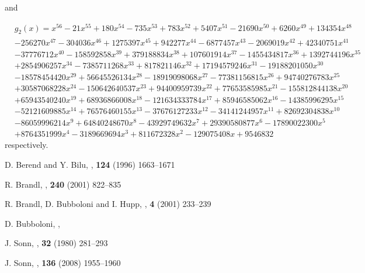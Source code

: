 \documentclass[reqno,12pt]{amsart}
\theoremstyle{remark}
\theoremstyle{definition}
\theoremstyle{citing}
\numberwithin{theorem}{section}
\numberwithin{equation}{section}
\begin{document}
and

\begin{eqnarray*}
 & g_{2}(x)=x^{56}-21x^{55}+180x^{54}-735x^{53}+783x^{52}+5407x^{51}-21690x^{50}+6260x^{49}+134354x^{48}\\
 & -256270x^{47}-304036x^{46}+1275397x^{45}+942277x^{44}-6877457x^{43}-2069019x^{42}+42340751x^{41}\\
 & -37776712x^{40}-158592858x^{39}+379188834x^{38}+107601914x^{37}-1455434817x^{36}+1392744196x^{35}\\
 & +2854906257x^{34}-7385711268x^{33}+817821146x^{32}+17194579246x^{31}-19188201050x^{30}\\
 & -18578454420x^{29}+56645526134x^{28}-18919098068x^{27}-77381156815x^{26}+94740276783x^{25}\\
 & +30587068228x^{24}-150642640537x^{23}+94400959739x^{22}+77653585985x^{21}-155812844138x^{20}\\
 & +65943540240x^{19}+68936866008x^{18}-121634333784x^{17}+85946585062x^{16}-14385996295x^{15}\\
 & -52121609885x^{14}+76576460155x^{13}-37676127233x^{12}-34141244957x^{11}+82692304838x^{10}\\
 & -86059996214x^{9}+64840248670x^{8}-43929749632x^{7}+29390580877x^{6}-17890022300x^{5}\\
 & +8764351999x^{4}-3189669694x^{3}+811672328x^{2}-129075408x+9546832\end{eqnarray*}
respectively.



\begin{thebibliography}{10}

D. Berend and Y. Bilu,
,
 {\bf 124} (1996) 1663--1671

R. Brandl,
,
 {\bf 240} (2001) 822--835

R. Brandl, D. Bubboloni and I. Hupp,
,
 {\bf 4} (2001) 233--239

D. Bubboloni,
,

J. Sonn,
,
 {\bf 32} (1980) 281--293

J. Sonn,
,
 {\bf 136} (2008) 1955--1960

\end{thebibliography}
\end{document}
